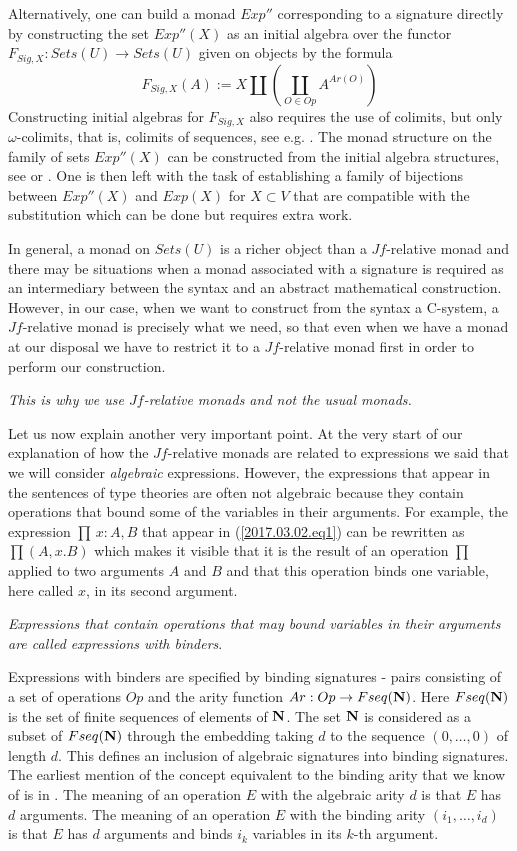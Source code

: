 \documentclass[12pt]{amsart}
\newcommand{\sr}{\rightarrow}
\newcommand{\nn}{{\bf N\rm}}
\newcommand{\nat}{\nn}
\begin{document}
Alternatively, one can build a monad $Exp''$ corresponding to a signature directly by constructing the set $Exp''(X)$ as an initial algebra over the functor $F_{Sig,X}:Sets(U)\sr Sets(U)$ given on objects by the formula
%
$$F_{Sig,X}(A):=X\coprod(\coprod_{O\in Op}A^{Ar(O)})$$
%
Constructing initial algebras for $F_{Sig,X}$ also requires the use of colimits, but only $\omega$-colimits, that is, colimits of sequences, see e.g. \cite{Adamek1974}. The monad structure on the family of sets $Exp''(X)$ can be constructed from the initial algebra structures, see \cite{Barr1970} or \cite[Th.3, p.161]{MatthesUustalu}. One is then left with the task of establishing a family of bijections between $Exp''(X)$ and $Exp(X)$ for $X\subset V$ that are compatible with the substitution which can be done but requires extra work. 

In general, a monad on $Sets(U)$ is a richer object than a $Jf$-relative monad and there may be situations when a monad associated with a signature is required as an intermediary between the syntax and an abstract mathematical construction. However, in our case, when we want to construct from the syntax a C-system,  a $Jf$-relative monad is precisely what we need, so that even when we have a monad at our disposal we have to restrict it to a $Jf$-relative monad first in order to perform our construction.   

{\em This is why we use $Jf$-relative monads and not the usual monads.}

Let us now explain another very important point. At the very start of our explanation of how the $Jf$-relative monads are related to expressions we said that we will consider {\em algebraic} expressions. However, the expressions that appear in the sentences of type theories are often not algebraic because they contain operations that bound some of the variables in their arguments. For example, the expression $\prod\,x:A,B$ that appear in (\ref{2017.03.02.eq1}) can be rewritten as $\prod(A,x.B)$ which makes it visible that it is the result of an operation $\prod$ applied to two arguments $A$ and $B$ and that this operation binds one variable, here called $x$, in its second argument. 

{\em Expressions that contain operations that may bound variables in their arguments are called expressions with binders}.
 
Expressions with binders are specified by binding signatures 
- pairs consisting of a set of operations $Op$ and the arity function $Ar:Op\sr Fseq(\nat)$. Here $Fseq(\nat)$ is the set of finite sequences of elements of $\nat$. The set $\nat$ is considered as a subset of $Fseq(\nat)$ through the embedding taking $d$ to the sequence $(0,\dots,0)$ of length $d$. This defines an inclusion of algebraic signatures into binding signatures. The earliest mention of the concept equivalent to the binding arity that we know of is in \cite{Aczel1978}. The meaning of an operation $E$ with the algebraic arity $d$ is that $E$ has $d$ arguments. The meaning of an operation $E$ with the binding arity $(i_1,\dots,i_d)$ is that $E$ has $d$ arguments and binds $i_k$ variables in its $k$-th argument. 
\end{document}
